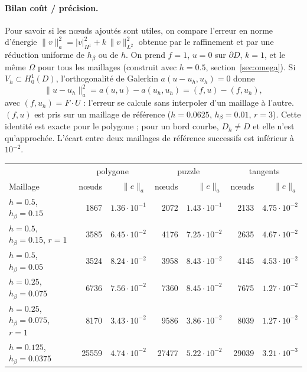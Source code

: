 \documentclass[11pt,a4paper]{article}
\begin{document}
\paragraph{Bilan coût / précision.} Pour savoir si les nœuds ajoutés sont
utiles, on compare l'erreur en norme d'énergie
$\|v\|_a^2 = |v|_{H^1}^2 + k\,\|v\|_{L^2}^2$ obtenue par le raffinement et
par une réduction uniforme de $h_\beta$ ou de $h$. On prend $f = 1$,
$u = 0$ sur $\partial D$, $k = 1$, et le même $\Omega$ pour tous les maillages
(construit avec $h = 0.5$, section~\ref{sec:omega}). Si
$V_h \subset H^1_0(D)$, l'orthogonalité de Galerkin
$a(u - u_h, u_h) = 0$ donne
\[
\|u - u_h\|_a^2 = a(u, u) - a(u_h, u_h) = (f, u) - (f, u_h),
\]
avec $(f, u_h) = F \cdot U$ : l'erreur se calcule sans interpoler d'un
maillage à l'autre. $(f, u)$ est pris sur un maillage de référence
($h = 0.0625$, $h_\beta = 0.01$, $r = 3$). Cette identité est exacte pour le
polygone ; pour un bord courbe, $D_h \neq D$ et elle n'est qu'approchée.
L'écart entre deux maillages de référence successifs est inférieur à
$10^{-2}$.
\begin{center}
\begin{tabular}{lrrrrrr}
\hline
& \multicolumn{2}{c}{polygone} & \multicolumn{2}{c}{puzzle} & \multicolumn{2}{c}{tangents} \\
Maillage & nœuds & $\|e\|_a$ & nœuds & $\|e\|_a$ & nœuds & $\|e\|_a$ \\
\hline
$h = 0.5$, $h_\beta = 0.15$             & 1867  & $1.36 \cdot 10^{-1}$ & 2072  & $1.43 \cdot 10^{-1}$ & 2133  & $4.75 \cdot 10^{-2}$ \\
$h = 0.5$, $h_\beta = 0.15$, $r = 1$    & 3585  & $6.45 \cdot 10^{-2}$ & 4176  & $7.25 \cdot 10^{-2}$ & 2635  & $4.67 \cdot 10^{-2}$ \\
$h = 0.5$, $h_\beta = 0.05$             & 3524  & $8.24 \cdot 10^{-2}$ & 3958  & $8.43 \cdot 10^{-2}$ & 4145  & $4.53 \cdot 10^{-2}$ \\
$h = 0.25$, $h_\beta = 0.075$           & 6736  & $7.56 \cdot 10^{-2}$ & 7360  & $8.45 \cdot 10^{-2}$ & 7675  & $1.27 \cdot 10^{-2}$ \\
$h = 0.25$, $h_\beta = 0.075$, $r = 1$  & 8170  & $3.43 \cdot 10^{-2}$ & 9586  & $3.86 \cdot 10^{-2}$ & 8039  & $1.27 \cdot 10^{-2}$ \\
$h = 0.125$, $h_\beta = 0.0375$         & 25559 & $4.74 \cdot 10^{-2}$ & 27477 & $5.22 \cdot 10^{-2}$ & 29039 & $3.21 \cdot 10^{-3}$ \\
\hline
\end{tabular}
\end{center}
\end{document}
